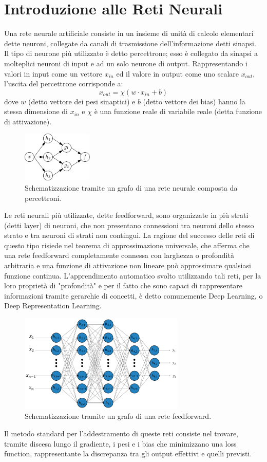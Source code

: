 \documentclass[Lau, noexaminfo, oneside]{sapthesis} %
\begin{document}
\section{Introduzione alle Reti Neurali}
Una rete neurale artificiale consiste in un insieme di unità di calcolo elementari dette neuroni, collegate da canali di trasmissione dell'informazione detti sinapsi.
Il tipo di neurone più utilizzato è detto percettrone; esso è collegato da sinapsi a molteplici neuroni di input e ad un solo neurone di output. Rappresentando i valori in input come un vettore $x_{in}$ ed il valore in output come uno scalare $x_{out}$, l'uscita del percettrone corrisponde a:
\begin{equation}
x_{out} = \chi (w \cdot x_{in} + b)
\end{equation}
dove $w$ (detto vettore dei pesi sinaptici) e $b$ (detto vettore dei bias) hanno la stessa dimensione di $x_{in}$ e $\chi$ è una funzione reale di variabile reale (detta funzione di attivazione).
\begin{figure}[H]
\includegraphics[width=0.3\textwidth]{grafo.pdf}
\centering
\caption{Schematizzazione tramite un grafo di una rete neurale composta da percettroni.}
\end{figure}
Le reti neurali più utilizzate, dette feedforward, sono organizzate in più strati (detti layer) di neuroni, che non presentano connessioni tra neuroni dello stesso strato e tra neuroni di strati non contingui.
La ragione del successo delle reti di questo tipo risiede nel teorema di approssimazione universale, che afferma che una rete feedforward completamente connessa con larghezza o profondità arbitraria e una funzione di attivazione non lineare può approssimare qualsiasi funzione continua. L'apprendimento automatico svolto utilizzando tali reti, per la loro proprietà di "profondità" e per il fatto che sono capaci di rappresentare informazioni tramite gerarchie di concetti, è detto comunemente Deep Learning, o Deep Representation Learning.
\begin{figure}[H]
\includegraphics[width=0.7\textwidth]{information-10-00122-g002.png}
\centering
\caption{Schematizzazione tramite un grafo di una rete feedforward.}
\end{figure}
Il metodo standard per l'addestramento di queste reti consiste nel trovare, tramite discesa lungo il gradiente, i pesi e i bias che minimizzano una loss function, rappresentante la discrepanza tra gli output effettivi e quelli previsti.
\end{document}

